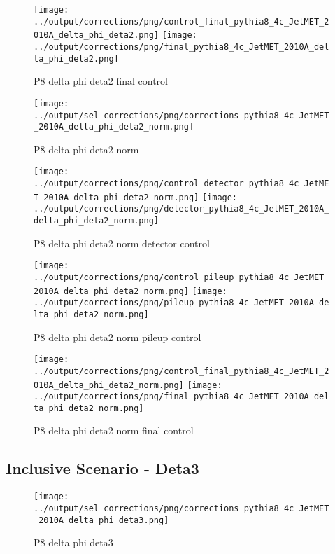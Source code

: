 \documentclass[11pt]{book}
\begin{document}
\begin{figure}[ht]
\centering
\texttt{[image: ../output/corrections/png/control\_final\_pythia8\_4c\_JetMET\_2010A\_delta\_phi\_deta2.png]}
\texttt{[image: ../output/corrections/png/final\_pythia8\_4c\_JetMET\_2010A\_delta\_phi\_deta2.png]}
\caption{P8 delta phi deta2 final control}
\label{fig:p8_JetMET_2010A_delta_phi_deta2_final_control}
\end{figure}


\begin{figure}[ht]
\centering
\texttt{[image: ../output/sel\_corrections/png/corrections\_pythia8\_4c\_JetMET\_2010A\_delta\_phi\_deta2\_norm.png]}
\caption{P8 delta phi deta2 norm}
\label{fig:p8_JetMET_2010A_delta_phi_deta2_norm}
\end{figure}

\begin{figure}[ht]
\centering
\texttt{[image: ../output/corrections/png/control\_detector\_pythia8\_4c\_JetMET\_2010A\_delta\_phi\_deta2\_norm.png]}
\texttt{[image: ../output/corrections/png/detector\_pythia8\_4c\_JetMET\_2010A\_delta\_phi\_deta2\_norm.png]}
\caption{P8 delta phi deta2 norm detector control}
\label{fig:p8_JetMET_2010A_delta_phi_deta2_norm_detector_control}
\end{figure}

\begin{figure}[ht]
\centering
\texttt{[image: ../output/corrections/png/control\_pileup\_pythia8\_4c\_JetMET\_2010A\_delta\_phi\_deta2\_norm.png]}
\texttt{[image: ../output/corrections/png/pileup\_pythia8\_4c\_JetMET\_2010A\_delta\_phi\_deta2\_norm.png]}
\caption{P8 delta phi deta2 norm pileup control}
\label{fig:p8_JetMET_2010A_delta_phi_deta2_norm_pileup_control}
\end{figure}


\begin{figure}[ht]
\centering
\texttt{[image: ../output/corrections/png/control\_final\_pythia8\_4c\_JetMET\_2010A\_delta\_phi\_deta2\_norm.png]}
\texttt{[image: ../output/corrections/png/final\_pythia8\_4c\_JetMET\_2010A\_delta\_phi\_deta2\_norm.png]}
\caption{P8 delta phi deta2 norm final control}
\label{fig:p8_JetMET_2010A_delta_phi_deta2_norm_final_control}
\end{figure}


\clearpage
\subsection{Inclusive Scenario - Deta3}
\begin{figure}[ht]
\centering
\texttt{[image: ../output/sel\_corrections/png/corrections\_pythia8\_4c\_JetMET\_2010A\_delta\_phi\_deta3.png]}
\caption{P8 delta phi deta3}
\label{fig:p8_JetMET_2010A_delta_phi_deta3}
\end{figure}
\end{document}
